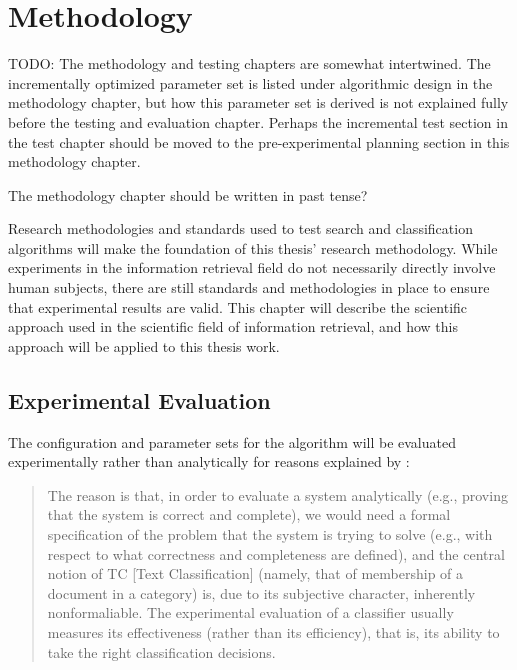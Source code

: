 
\chapter{Methodology} %

\label{Methodology} %


\color{red}TODO: The methodology and testing chapters are somewhat intertwined. The incrementally optimized parameter set is listed under algorithmic design in the methodology chapter, but how this parameter set is derived is not explained fully before the testing and evaluation chapter. Perhaps the incremental test section in the test chapter should be moved to the pre-experimental planning section in this methodology chapter.

The methodology chapter should be written in past tense?

\color{black}

Research methodologies and standards used to test search and classification algorithms will make the foundation of this thesis' research methodology. While experiments in the information retrieval field do not necessarily directly involve human subjects, there are still standards and methodologies in place to ensure that experimental results are valid. This chapter will describe the scientific approach used in the scientific field of information retrieval, and how this approach will be applied to this thesis work.

\section{Experimental Evaluation}
\label{ExperimentalEvaluation}
The configuration and parameter sets for the \CTC algorithm will be evaluated experimentally rather than analytically for reasons explained by \cite[p. 32]{Sebastiani2002}:
\begin{quote}The reason is that, in order to evaluate a system analytically (e.g., proving that the system is correct and complete), we would need a formal specification of the problem that the system is trying to solve (e.g., with respect to what correctness and completeness are defined), and the central notion of TC [Text Classification] (namely, that of membership of a document in a category) is, due to its subjective character, inherently nonformaliable. The experimental evaluation of a classifier usually measures its effectiveness (rather than its efficiency), that is, its ability to take the right classification decisions.
\end{quote}

